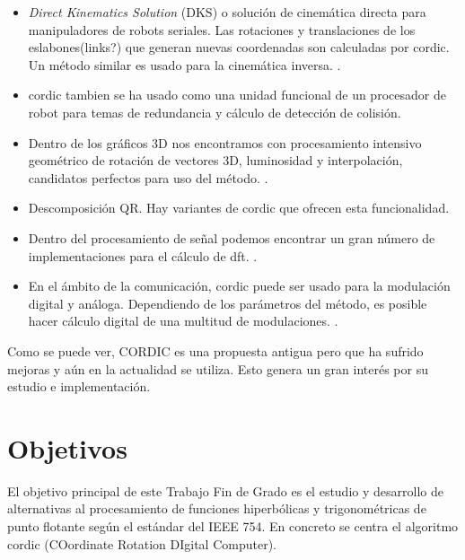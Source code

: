 \begin{itemize}
  \item \textit{Direct Kinematics Solution} (DKS) o solución de cinemática directa para manipuladores de robots seriales. Las rotaciones y translaciones de los eslabones(links?) que generan nuevas coordenadas son calculadas por \gls{cordic}. Un método similar es usado para la cinemática inversa. \cite{lee_maximum_1987}.
  
  \item \gls{cordic} tambien se ha usado como una unidad funcional de un procesador de robot para temas de redundancia y cálculo de detección de colisión.
  
  \item Dentro de los gráficos 3D nos encontramos con procesamiento intensivo geométrico de rotación de vectores 3D, luminosidad y interpolación, candidatos perfectos para uso del método. \cite{lang_high-throughput_2005}.
  
  \item Descomposición QR. Hay variantes de \gls{cordic} que ofrecen esta funcionalidad. \cite{hu_cordic-based_1992}
  
  \item  Dentro del procesamiento de señal podemos encontrar un gran número de implementaciones para el cálculo de \gls{dft}.  \cite{das_unified_2002}.
  
  \item En el ámbito de la comunicación, \gls{cordic} puede ser usado para la modulación digital y análoga. Dependiendo de los parámetros del método, es posible hacer cálculo digital de una multitud de modulaciones. \cite{valls_use_2006}.
\end{itemize}

Como se puede ver, CORDIC es una propuesta antigua pero que ha sufrido mejoras y aún en la actualidad se utiliza. Esto genera un gran interés por su estudio e implementación.

\section{Objetivos}
\label{objetivos}

El objetivo principal de este Trabajo Fin de Grado es el estudio y desarrollo de alternativas al procesamiento de funciones hiperbólicas y trigonométricas de punto flotante según el estándar del IEEE 754. En concreto se centra el algoritmo \gls{cordic} (COordinate Rotation DIgital Computer).

